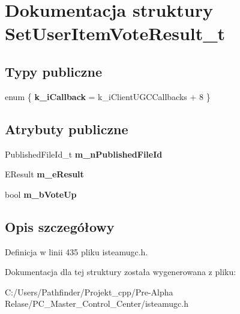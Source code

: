 \hypertarget{struct_set_user_item_vote_result__t}{}\section{Dokumentacja struktury Set\+User\+Item\+Vote\+Result\+\_\+t}
\label{struct_set_user_item_vote_result__t}
\subsection*{Typy publiczne}
\begin{DoxyCompactItemize}
\item 
\mbox{\label{struct_set_user_item_vote_result__t_ae2387dbeb6fc121ff237a53c483bfbf1}} 
enum \{ {\bfseries k\+\_\+i\+Callback} = k\+\_\+i\+Client\+U\+G\+C\+Callbacks + 8
 \}
\end{DoxyCompactItemize}
\subsection*{Atrybuty publiczne}
\begin{DoxyCompactItemize}
\item 
\mbox{\label{struct_set_user_item_vote_result__t_a788cee1405fa61c5fa3e0b70cb7e0035}} 
Published\+File\+Id\+\_\+t {\bfseries m\+\_\+n\+Published\+File\+Id}
\item 
\mbox{\label{struct_set_user_item_vote_result__t_ac0a2570c4b893bab50fdcdb3d86a35fc}} 
E\+Result {\bfseries m\+\_\+e\+Result}
\item 
\mbox{\label{struct_set_user_item_vote_result__t_a8d10cf12024b9c065e4a6d3f00103aa0}} 
bool {\bfseries m\+\_\+b\+Vote\+Up}
\end{DoxyCompactItemize}


\subsection{Opis szczegółowy}


Definicja w linii 435 pliku isteamugc.\+h.



Dokumentacja dla tej struktury została wygenerowana z pliku\+:\begin{DoxyCompactItemize}
\item 
C\+:/\+Users/\+Pathfinder/\+Projekt\+\_\+cpp/\+Pre-\/\+Alpha Relase/\+P\+C\+\_\+\+Master\+\_\+\+Control\+\_\+\+Center/isteamugc.\+h\end{DoxyCompactItemize}
